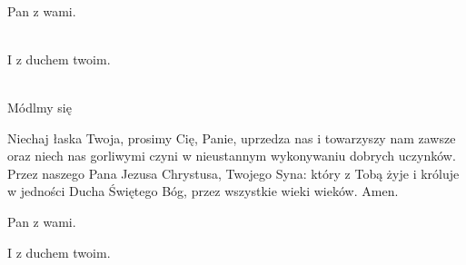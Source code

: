 \newcommand{\dominusvobiscum}{
  \rubric{\Vbar}Pan z wami.
}
\newcommand{\etcumspiritutuo}{
  \rubric{\Rbar}I z duchem twoim.
}

\\
\dominusvobiscum
\\
\etcumspiritutuo
\\
Módlmy się

Niechaj łaska Twoja, prosimy Cię, Panie, uprzedza nas i towarzyszy nam zawsze oraz niech nas gorliwymi czyni w nieustannym wykonywaniu dobrych uczynków. Przez naszego Pana Jezusa Chrystusa, Twojego Syna: który z Tobą żyje i króluje w jedności Ducha Świętego Bóg, przez wszystkie wieki wieków. \rubric{\Rbar} Amen.

\dominusvobiscum

\etcumspiritutuo
